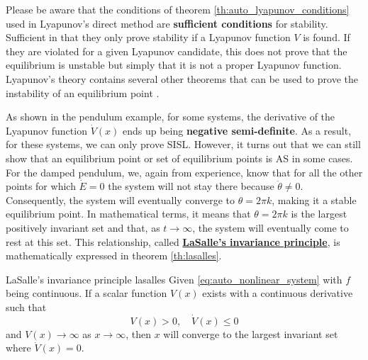 Please be aware that the conditions of theorem \ref{th:auto_lyapunov_conditions} used in Lyapunov's direct method are \textbf{sufficient conditions} for stability. Sufficient in that they only prove stability if a Lyapunov function $V$ is found. If they are violated for a given Lyapunov candidate, this does not prove that the equilibrium is unstable but simply that it is not a proper Lyapunov function. Lyapunov's theory contains several other theorems that can be used to prove the instability of an equilibrium point \cite{khalilNonlinearSystems2002}.

As shown in the pendulum example, for some systems, the derivative of the Lyapunov function $\dot{V}\left(x \right)$ ends up being \textbf{negative semi-definite}. As a result, for these systems, we can only prove SISL. However, it turns out that we can still show that an equilibrium point or set of equilibrium points is AS in some cases. For the damped pendulum, we, again from experience, know that for all the other points for which $\dot{E} = 0$ the system will not stay there because $\ddot{ \theta }\neq 0$. Consequently, the system will eventually converge to $\theta = 2 \pi k$, making it a stable equilibrium point. In mathematical terms, it means that $\theta = 2 \pi k$ is the largest positively invariant set and that, as $t \rightarrow\infty$, the system will eventually come to rest at this set. This relationship, called \textbf{\hyperref[th:lasalles]{LaSalle's invariance principle}}, is mathematically expressed in theorem \ref{th:lasalles}.

\begin{theorem}[list text=LaSalle's invariance principle,after pre=\footnotetext{Theorem 4.4 of \cite{khalilNonlinearSystems2002} was reworded to improve readability.}]{LaSalle's invariance principle \cite{khalilNonlinearSystems2002}\footnotemark}{lasalles}
  Given \eqref{eq:auto_nonlinear_system} with $f$ being continuous. If a scalar function $V \left( x \right)$ exists with a continuous derivative such that
  \begin{equation}
    V \left( x \right)> 0, \quad \dot{ V }\left( x \right) \le 0
  \end{equation}
  and $V \left( x \right)\rightarrow\infty$ as $x \rightarrow \infty$, then $x$ will converge to the largest invariant set where $\dot{V}\left( x \right) = 0$.
\end{theorem}

